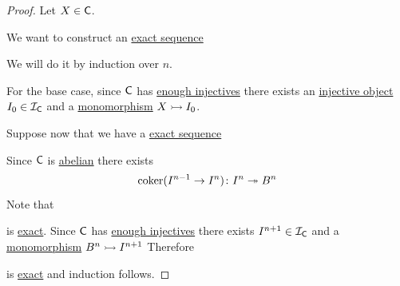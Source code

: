 \documentclass[../../main]{subfiles}
\begin{document}
\begin{proof}
  Let \(X \in \mathsf{C}\).

  We want to construct an \hyperref[def:exact-sequence]{exact sequence}
  \begin{center}
  \end{center}
  We will do it by induction over \(n\).

  For the base case, since \(\mathsf{C}\) has \hyperref[def:enough-injectives-projectives]{enough injectives} there exists an \hyperref[def:injective-projective-object]{injective object} \(I_{0} \in \mathcal{I}_{\mathsf{C}}\) and a \hyperref[def:mono-epi-morphism]{monomorphism} \(X \rightarrowtail I_{0}\).

  Suppose now that we have a \hyperref[def:exact-sequence]{exact sequence}
  \begin{center}
  \end{center}
  Since \(\mathsf{C}\) is \hyperref[def:abelian-category]{abelian} there exists
  \begin{equation*}
    \operatorname*{coker}(I^{n-1} \to I^{n})\colon I^{n} \twoheadrightarrow B^{n}
  \end{equation*}
  Note that
  \begin{center}
  \end{center} 
  is \hyperref[def:exact-sequence]{exact}.
  Since \(\mathsf{C}\) has \hyperref[def:enough-injectives-projectives]{enough injectives} there exists \(I^{n+1} \in \mathcal{I}_{\mathsf{C}}\) and a \hyperref[def:mono-epi-morphism]{monomorphism} \(B^{n} \rightarrowtail I^{n+1}\)
  Therefore
  \begin{center}
  \end{center}
  is \hyperref[def:exact-sequence]{exact} and induction follows.
\end{proof}
\end{document}

